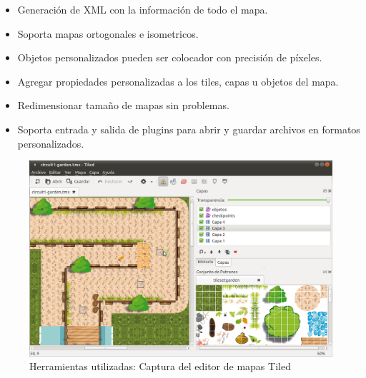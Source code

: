 \begin{itemize}
    \item Generación de XML con la información de todo el mapa.
    
    \item Soporta mapas ortogonales e isometricos.
    
    \item Objetos personalizados pueden ser colocador con precisión de píxeles.
    
    \item Agregar propiedades personalizadas a los tiles, capas u objetos del mapa.
    
    \item Redimensionar tamaño de mapas sin problemas.
    
    \item Soporta entrada y salida de plugins para abrir y guardar archivos en formatos personalizados.
\end{itemize}

\begin{figure}[H]
  \label{captura_tiled}
  \begin{center}
    \includegraphics[scale=0.35]{imagenes/captura_tiled.png}
  \end{center}
  \caption{Herramientas utilizadas: Captura del editor de mapas Tiled}
\end{figure}
